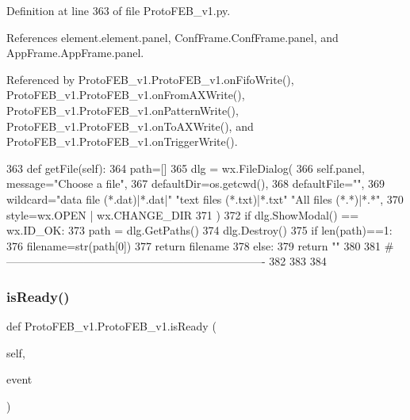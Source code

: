 Definition at line 363 of file Proto\+F\+E\+B\+\_\+v1.\+py.



References element.\+element.\+panel, Conf\+Frame.\+Conf\+Frame.\+panel, and App\+Frame.\+App\+Frame.\+panel.



Referenced by Proto\+F\+E\+B\+\_\+v1.\+Proto\+F\+E\+B\+\_\+v1.\+on\+Fifo\+Write(), Proto\+F\+E\+B\+\_\+v1.\+Proto\+F\+E\+B\+\_\+v1.\+on\+From\+A\+X\+Write(), Proto\+F\+E\+B\+\_\+v1.\+Proto\+F\+E\+B\+\_\+v1.\+on\+Pattern\+Write(), Proto\+F\+E\+B\+\_\+v1.\+Proto\+F\+E\+B\+\_\+v1.\+on\+To\+A\+X\+Write(), and Proto\+F\+E\+B\+\_\+v1.\+Proto\+F\+E\+B\+\_\+v1.\+on\+Trigger\+Write().


\begin{DoxyCode}
363     \textcolor{keyword}{def }getFile(self):
364         path=[]
365         dlg = wx.FileDialog(
366             self.panel, message=\textcolor{stringliteral}{"Choose a file"},
367             defaultDir=os.getcwd(),
368             defaultFile=\textcolor{stringliteral}{""},
369             wildcard=\textcolor{stringliteral}{"data file (*.dat)|*.dat|"} \textcolor{stringliteral}{"text files (*.txt)|*.txt"} \textcolor{stringliteral}{"All files (*.*)|*.*"},
370             style=wx.OPEN | wx.CHANGE\_DIR
371             )
372         \textcolor{keywordflow}{if} dlg.ShowModal() == wx.ID\_OK:
373             path = dlg.GetPaths()
374         dlg.Destroy()
375         \textcolor{keywordflow}{if} len(path)==1:
376             filename=str(path[0])
377             \textcolor{keywordflow}{return} filename
378         \textcolor{keywordflow}{else}:
379             \textcolor{keywordflow}{return} \textcolor{stringliteral}{""}
380 
381 \textcolor{comment}{#----------------------------------------------------------------------}
382 
383 
384 
\end{DoxyCode}
\mbox{\label{classProtoFEB__v1_1_1ProtoFEB__v1_a86ddf60f41d52256f25276c39899b032}} 
\subsubsection{\texorpdfstring{is\+Ready()}{isReady()}}
{\footnotesize\ttfamily def Proto\+F\+E\+B\+\_\+v1.\+Proto\+F\+E\+B\+\_\+v1.\+is\+Ready (\begin{DoxyParamCaption}\item[{}]{self,  }\item[{}]{event }\end{DoxyParamCaption})}



